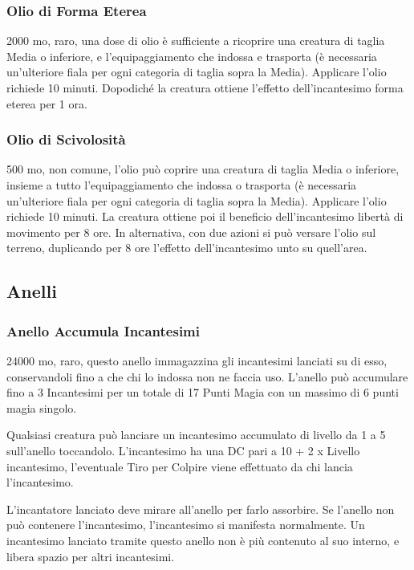 \begin{multicols}{2}
\subsubsection*{Olio di Forma Eterea}
2000 mo, raro, una dose di olio è sufficiente a ricoprire una creatura di taglia Media o inferiore, e l'equipaggiamento che indossa e trasporta (è necessaria un'ulteriore fiala per ogni categoria di taglia sopra la Media). Applicare l'olio richiede 10 minuti. Dopodiché la creatura ottiene l'effetto dell'incantesimo forma eterea per 1 ora.

\subsubsection*{Olio di Scivolosità}
500 mo, non comune, l'olio può coprire una creatura di taglia Media o inferiore, insieme a tutto l'equipaggiamento che indossa o trasporta (è necessaria un'ulteriore fiala per ogni categoria di taglia sopra la Media). Applicare l'olio richiede 10 minuti. La creatura ottiene poi il beneficio dell'incantesimo libertà di movimento per 8 ore. In alternativa, con due azioni si può versare l'olio sul terreno, duplicando per 8 ore l'effetto dell'incantesimo unto su quell'area.


\subsection{Anelli}

\subsubsection*{Anello Accumula Incantesimi}
24000 mo, raro, questo anello immagazzina gli incantesimi lanciati su di esso, conservandoli fino a che chi lo indossa non ne faccia uso. L'anello può accumulare fino a 3 Incantesimi per un totale di 17 Punti Magia con un massimo di 6 punti magia singolo.

Qualsiasi creatura può lanciare un incantesimo accumulato di livello da 1 a 5 sull'anello toccandolo. L'incantesimo ha una DC pari a 10 + 2 x Livello incantesimo, l'eventuale Tiro per Colpire viene effettuato da chi lancia l'incantesimo.

L'incantatore lanciato deve mirare all'anello per farlo assorbire. Se l'anello non può contenere l'incantesimo, l'incantesimo si manifesta normalmente. Un incantesimo lanciato tramite questo anello non è più contenuto al suo interno, e libera spazio per altri incantesimi.


\end{multicols}
